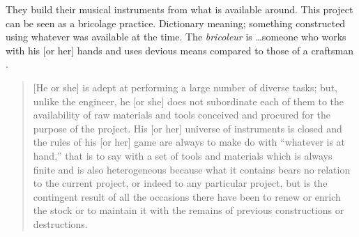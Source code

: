 They build their musical instruments from what is available around. This project can be seen as a bricolage practice. Dictionary meaning; something constructed using whatever was available at the time.  The \textit{bricoleur} is \ldots someone who works with his [or her] hands and uses devious means compared to those of a craftsman \citep{levi1966savage}.


\begin{quote}
[He or she] is adept at performing a large number of diverse tasks; but, unlike the engineer, he [or she] does not subordinate each of them to the availability of raw materials and tools conceived and procured for the purpose of the project. His [or her] universe of instruments is closed and the rules of his [or her] game are always to make do with “whatever is at hand,” that is to say with a set of tools and materials which is always finite and is also heterogeneous because what it contains bears no relation to the current project, or indeed to any particular project, but is the contingent result of all the occasions there have been to renew or enrich the stock or to maintain it with the remains of previous constructions or destructions.\cite{levi1966savage}
\end{quote}


